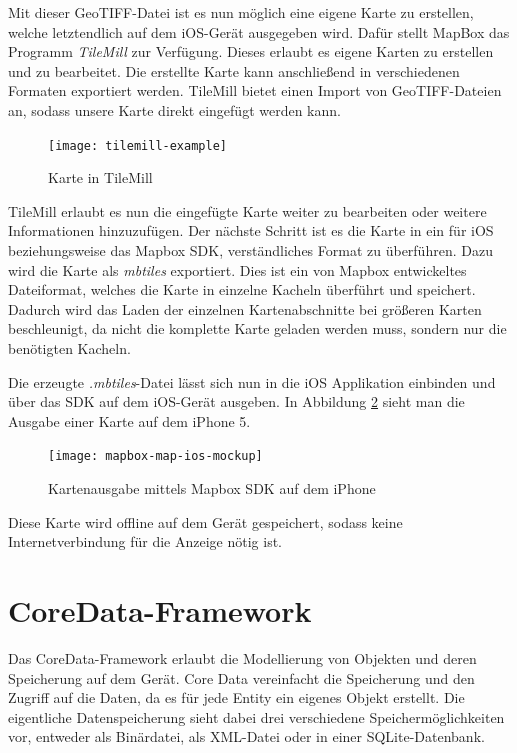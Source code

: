 Mit dieser GeoTIFF-Datei ist es nun möglich eine eigene Karte zu erstellen, welche letztendlich auf dem iOS-Gerät ausgegeben wird.
Dafür stellt MapBox das Programm \emph{TileMill} zur Verfügung. Dieses erlaubt es eigene Karten zu erstellen und zu bearbeitet. Die erstellte Karte kann anschließend in verschiedenen Formaten exportiert werden. 
TileMill bietet einen Import von GeoTIFF-Dateien an, sodass unsere Karte direkt eingefügt werden kann.

\begin{figure}[htb!]
	\centering
	\texttt{[image: tilemill-example]}
	\caption{Karte in TileMill}
	\label{tilemill-example}
\end{figure}

TileMill erlaubt es nun die eingefügte Karte weiter zu bearbeiten oder weitere Informationen hinzuzufügen.
Der nächste Schritt ist es die Karte in ein für iOS beziehungsweise das Mapbox SDK, verständliches Format zu überführen.
Dazu wird die Karte als \emph{mbtiles} exportiert. Dies ist ein von Mapbox entwickeltes Dateiformat, welches die Karte in einzelne Kacheln überführt und speichert. Dadurch wird das Laden der einzelnen Kartenabschnitte bei größeren Karten beschleunigt, da nicht die komplette Karte geladen werden muss, sondern nur die benötigten Kacheln.

Die erzeugte \emph{.mbtiles}-Datei lässt sich nun in die iOS Applikation einbinden und über das SDK auf dem iOS-Gerät ausgeben. In Abbildung \ref{mapbox-map-ios} sieht man die Ausgabe einer Karte auf dem iPhone 5.

\begin{figure}[htb!]
		\centering
	\texttt{[image: mapbox-map-ios-mockup]}
	\caption{Kartenausgabe mittels Mapbox SDK auf dem iPhone}
	\label{mapbox-map-ios}
\end{figure}

Diese Karte wird offline auf dem Gerät gespeichert, sodass keine Internetverbindung für die Anzeige nötig ist.

\section{CoreData-Framework}
\label{sec:technologies:coredata}
Das CoreData-Framework erlaubt die Modellierung von Objekten und deren Speicherung auf dem Gerät.
Core Data vereinfacht die Speicherung und den Zugriff auf die Daten, da es für jede Entity ein eigenes Objekt erstellt.
Die eigentliche Datenspeicherung sieht dabei drei verschiedene Speichermöglichkeiten vor, entweder als Binärdatei, als XML-Datei oder in einer SQLite-Datenbank. 

